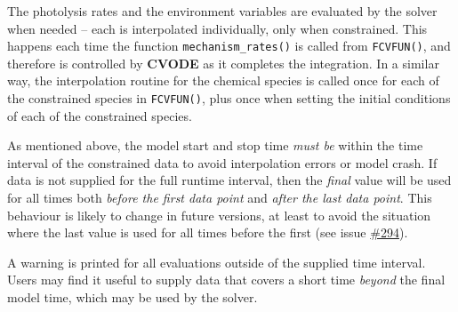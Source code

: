The photolysis rates and the environment variables are evaluated by
the solver when needed -- each is interpolated individually, only when
constrained. This happens each time the function
\texttt{mechanism\_rates()} is called from \texttt{FCVFUN()}, and
therefore is controlled by \textbf{CVODE} as it completes the
integration. In a similar way, the interpolation routine for the
chemical species is called once for each of the constrained species in
\texttt{FCVFUN()}, plus once when setting the initial conditions of
each of the constrained species.

As mentioned above, the model start and stop time \emph{must be}
within the time interval of the constrained data to avoid
interpolation errors or model crash. If data is not supplied for the
full runtime interval, then the \emph{final} value will be used for
all times both \emph{before the first data point} and \emph{after the
  last data point}. This behaviour is likely to change in future
versions, at least to avoid the situation where the last value is used
for all times before the first (see issue
\href{https://github.com/AtChem/AtChem2/issues/294}{\#294}).

A warning is printed for all evaluations outside of the supplied time
interval. Users may find it useful to supply data that covers a short
time \emph{beyond} the final model time, which may be used by the
solver.
